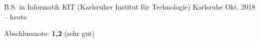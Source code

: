 


\begin{cventries}


\cventry
  {B.S. in Informatik} %
  {KIT (Karlsruher Institut für Technologie)} %
  {Karlsruhe} %
  {Okt. 2018 -- heute} %
  {
    \begin{cvitems} %
      {Abschlussnote: \textbf{1,2} (sehr gut)}
    \end{cvitems}
  }

\end{cventries}
